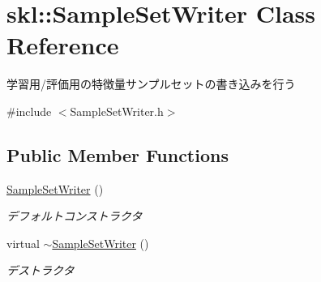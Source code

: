 \hypertarget{classskl_1_1_sample_set_writer}{}\section{skl\+:\+:Sample\+Set\+Writer Class Reference}
\label{classskl_1_1_sample_set_writer}


学習用/評価用の特徴量サンプルセットの書き込みを行う  




{\ttfamily \#include $<$Sample\+Set\+Writer.\+h$>$}

\subsection*{Public Member Functions}
\begin{DoxyCompactItemize}
\item 
\hypertarget{classskl_1_1_sample_set_writer_a2193c88247abcc0d7bc9b9d5154c9162}{}\label{classskl_1_1_sample_set_writer_a2193c88247abcc0d7bc9b9d5154c9162} 
\hyperlink{classskl_1_1_sample_set_writer_a2193c88247abcc0d7bc9b9d5154c9162}{Sample\+Set\+Writer} ()
\begin{DoxyCompactList}\small\item\em デフォルトコンストラクタ \end{DoxyCompactList}\item 
\hypertarget{classskl_1_1_sample_set_writer_ae8f6c309540896caca318ea94a420f62}{}\label{classskl_1_1_sample_set_writer_ae8f6c309540896caca318ea94a420f62} 
virtual \hyperlink{classskl_1_1_sample_set_writer_ae8f6c309540896caca318ea94a420f62}{$\sim$\+Sample\+Set\+Writer} ()
\begin{DoxyCompactList}\small\item\em デストラクタ \end{DoxyCompactList}\end{DoxyCompactItemize}
